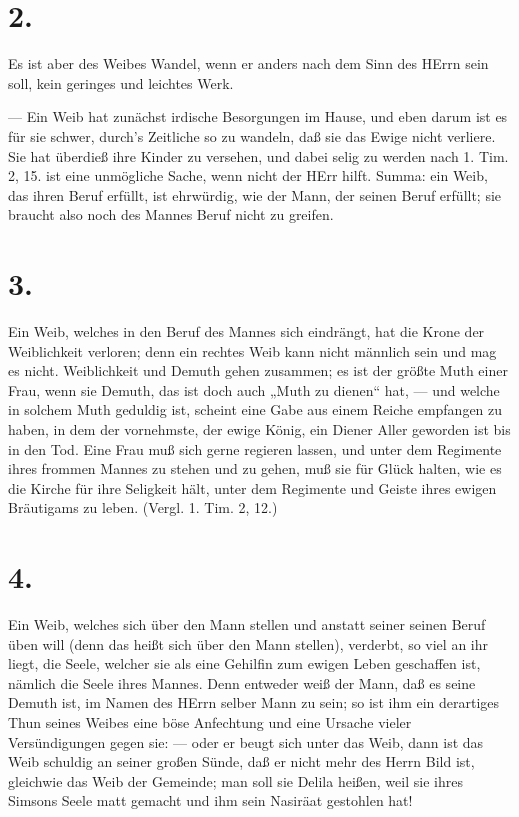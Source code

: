\section{2.}

Es ist aber des Weibes Wandel, wenn er anders nach dem Sinn des HErrn sein soll, kein geringes und leichtes Werk.

— Ein Weib hat zunächst irdische Besorgungen im Hause, und eben darum ist es für sie schwer, durch’s Zeitliche so zu wandeln, daß sie das Ewige nicht verliere. Sie hat überdieß
ihre Kinder zu versehen, und dabei selig zu werden nach 1. Tim. 2, 15. ist eine unmögliche Sache, wenn nicht der HErr hilft. Summa: ein Weib, das ihren Beruf erfüllt, ist ehrwürdig, wie der Mann, der seinen Beruf erfüllt; sie braucht also noch des Mannes Beruf nicht zu greifen.

\section{3.}

Ein Weib, welches in den Beruf des Mannes sich eindrängt, hat die Krone der Weiblichkeit verloren; denn ein rechtes Weib kann nicht männlich sein und mag es nicht. Weiblichkeit und Demuth gehen zusammen; es ist der größte Muth einer Frau, wenn sie Demuth, das ist doch auch „Muth zu dienen“ hat, — und welche in solchem Muth geduldig ist, scheint eine Gabe aus einem Reiche empfangen zu haben, in dem der vornehmste, der ewige König, ein Diener Aller geworden ist bis in den Tod. Eine Frau muß sich gerne regieren lassen, und unter dem Regimente ihres frommen Mannes zu stehen und zu gehen, muß sie für Glück halten, wie es die Kirche für ihre Seligkeit hält, unter dem Regimente und Geiste ihres ewigen Bräutigams zu leben. (Vergl. 1. Tim. 2, 12.)

\section{4.}

Ein Weib, welches sich über den Mann stellen und anstatt seiner seinen Beruf üben will (denn das heißt sich über den Mann stellen), verderbt, so viel an ihr liegt, die Seele, welcher sie als eine Gehilfin zum ewigen Leben geschaffen ist, nämlich die Seele ihres Mannes. Denn entweder weiß der Mann, daß es seine Demuth ist, im Namen des HErrn selber Mann zu sein; so ist ihm ein derartiges Thun seines Weibes
eine böse Anfechtung und eine Ursache vieler Versündigungen gegen sie: — oder er beugt sich unter das Weib, dann ist das Weib schuldig an seiner großen Sünde, daß er nicht mehr des Herrn Bild ist, gleichwie das Weib der Gemeinde; man soll sie Delila heißen, weil sie ihres Simsons Seele matt gemacht und ihm sein Nasiräat gestohlen hat!

